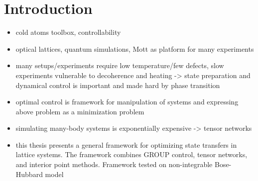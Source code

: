 \chapter{Introduction}

\begin{itemize}
\item
cold atoms toolbox, controllability 

\item
optical lattices, quantum simulations, Mott as platform for many experiments

\item
many setups/experiments require low temperature/few defects, slow experiments vulnerable to decoherence and heating -> state preparation and dynamical control is important and made hard by phase transition

\item
optimal control is framework for manipulation of systems and expressing above problem as a minimization problem

\item 
simulating many-body systems is exponentially expensive -> tensor networks 

\item
this thesis presents a general framework for optimizing state transfers in lattice systems. The framework combines GROUP control, tensor networks, and interior point methods. Framework tested on non-integrable Bose-Hubbard model
\end{itemize}